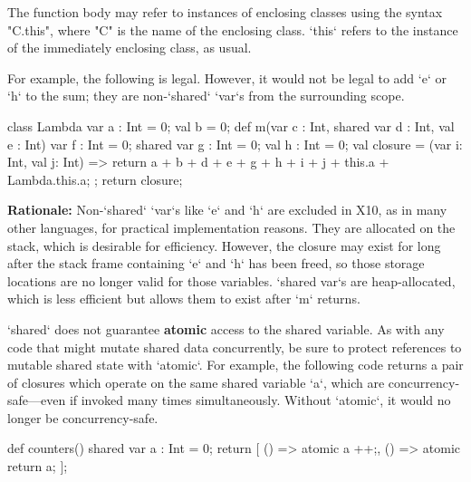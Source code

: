 The function body may refer to instances of enclosing classes using
the syntax \xcd"C.this", where \xcd"C" is the name of the
enclosing class.  \xcd`this` refers to the instance of the immediately
enclosing class, as usual.

For example, the following is legal.  However, it would not be legal to add
\xcd`e` or \xcd`h` to the sum; they are non-\xcd`shared` \xcd`var`s from the
surrounding scope.

\begin{xten}
class Lambda {
   var a : Int = 0;
   val b = 0;
   def m(var c : Int, shared var d : Int,  val e : Int) {
      var f : Int = 0;
      shared var g : Int = 0;
      val h : Int = 0;
      val closure = (var i: Int, val j: Int) => {
    	  return a + b + d + e + g + h + i + j + this.a + Lambda.this.a;
      };
      return closure;
   }
}
\end{xten}


{\bf Rationale:} Non-\xcd`shared` \xcd`var`s like \xcd`e` and \xcd`h` are
excluded in X10, as in many other languages, for practical implementation
reasons. They are allocated on the stack, which is desirable for efficiency.
However, the closure may exist for long after the stack frame containing
\xcd`e` and \xcd`h` has been freed, so those storage locations are no longer
valid for those variables. \xcd`shared var`s are heap-allocated, which is less
efficient but allows them to exist after \xcd`m` returns. 


\xcd`shared` does not guarantee {\bf atomic} access to the shared variable. As
with any code that might mutate shared data concurrently, be sure to protect
references to mutable shared state with \xcd`atomic`. For example, the
following code returns a pair of closures which operate on the same shared
variable \xcd`a`, which are concurrency-safe---even if invoked many times
simultaneously. Without \xcd`atomic`, it would no longer be concurrency-safe.


\begin{xten}
  def counters() {
      shared var a : Int = 0;
       return [
          () => {atomic a ++;},
          () => {atomic return a;}
          ];
   }
\end{xten}
%



